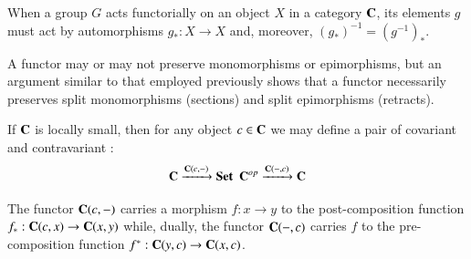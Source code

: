 \documentclass[12pt, a4paper, oneside, openright, titlepage]{book}
\begin{document}
\begin{cor}
    When a group $G$ acts functorially on an object $X$ in a category $\normalfont\textbf{C}$, its elements $g$ must act by automorphisms $g_*:X\rightarrow X$ and, moreover, $(g_*)^{-1} = (g^{-1})_*$.
\end{cor}

A functor may or may not preserve monomorphisms or epimorphisms, but an argument similar to that employed previously shows that a functor necessarily preserves split monomorphisms (sections) and split epimorphisms (retracts).


\begin{defn}
    If $\normalfont\textbf{C}$ is locally small, then for any object $c \in \normalfont\textbf{C}$ we may define a pair of covariant and contravariant : 
    \begin{equation*}
        \normalfont\textbf{C}\xrightarrow{\normalfont\textbf{C}(c,-)}\normalfont\textbf{Set}\hspace{5pt}\normalfont\textbf{C}^{op}\xrightarrow{\normalfont\textbf{C}(-,c)}\normalfont\textbf{C}
    \end{equation*}
    \begin{center}
    \end{center}
    The functor $\normalfont\textbf{C}(c,-)$ carries a morphism $f:x\rightarrow y$ to the post-composition function $f_*:\normalfont\textbf{C}(c,x)\rightarrow \normalfont\textbf{C}(x,y)$ while, dually, the functor $\normalfont\textbf{C}(-,c)$ carries $f$ to the pre-composition function $f^*:\normalfont\textbf{C}(y,c)\rightarrow \normalfont\textbf{C}(x,c)$. 
\end{defn}
\end{document}
